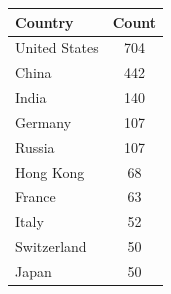 \begin{tabular}{lc}
\toprule
Country & Count \\
\midrule
United States & 704 \\
China & 442 \\
India & 140 \\
Germany & 107 \\
Russia & 107 \\
Hong Kong & 68 \\
France & 63 \\
Italy & 52 \\
Switzerland & 50 \\
Japan & 50 \\
\bottomrule
\end{tabular}